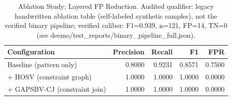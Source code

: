 \begin{table}[htbp]
  \centering
  \caption{Ablation Study: Layered FP Reduction. Audited qualifier: legacy handwritten ablation table (self-labeled synthetic samples), not the verified binary pipeline; verified caliber: F1=0.939, n=121, FP=14, TN=0 (see deemo/test_reports/binary_pipeline_full.json).}
  \label{tab:ablation_fp_reduction}
  \begin{tabular}{lrrrr}
    \toprule
    Configuration & Precision & Recall & F1 & FPR \\
    \midrule
    Baseline (pattern only) & 0.8000 & 0.9231 & 0.8571 & 0.7500 \\
    + HOSV (constraint graph) & 1.0000 & 1.0000 & 1.0000 & 0.0000 \\ %
    + GAPSBV-CJ (constraint join) & 1.0000 & 1.0000 & 1.0000 & 0.0000 \\ %
    \bottomrule
  \end{tabular}
\end{table}